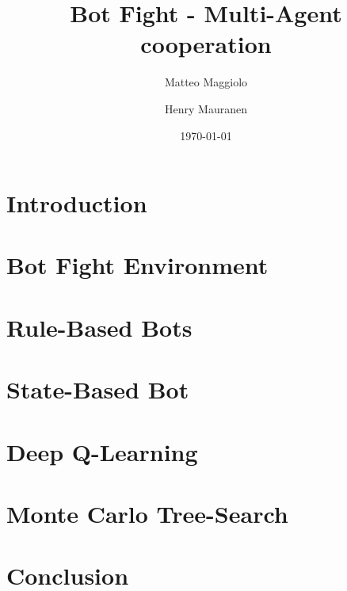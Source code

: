 \documentclass{article}
\title{Bot Fight - Multi-Agent cooperation}
\author{Matteo Maggiolo \and Henry Mauranen}
\date{\today}
\begin{document}
	
	
	\section{Introduction}
	
	\section{Bot Fight Environment}
	
	\section{Rule-Based Bots}
	
	\section{State-Based Bot}
	
	\section{Deep Q-Learning}
	
	\section{Monte Carlo Tree-Search}
	
	\section{Conclusion}
	
\end{document}
